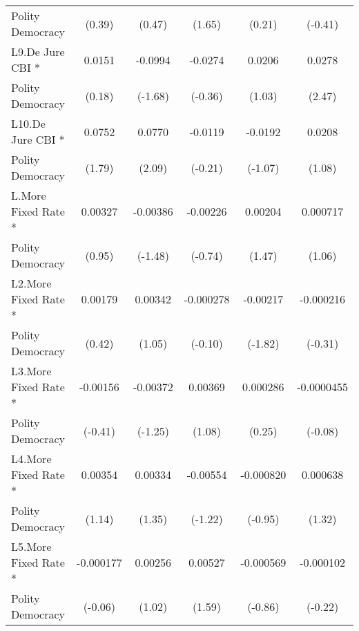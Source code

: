 {\begin{tabular}{l*{5}{c}}
Polity Democracy    &      (0.39)         &      (0.47)         &      (1.65)         &      (0.21)         &     (-0.41)         \\
[1em]
L9.De Jure CBI *    &      0.0151         &     -0.0994         &     -0.0274         &      0.0206         &      0.0278\sym{*}  \\
Polity Democracy    &      (0.18)         &     (-1.68)         &     (-0.36)         &      (1.03)         &      (2.47)         \\
[1em]
L10.De Jure CBI *   &      0.0752         &      0.0770\sym{*}  &     -0.0119         &     -0.0192         &      0.0208         \\
Polity Democracy    &      (1.79)         &      (2.09)         &     (-0.21)         &     (-1.07)         &      (1.08)         \\
[1em]
L.More Fixed Rate * &     0.00327         &    -0.00386         &    -0.00226         &     0.00204         &    0.000717         \\
Polity Democracy    &      (0.95)         &     (-1.48)         &     (-0.74)         &      (1.47)         &      (1.06)         \\
[1em]
L2.More Fixed Rate *&     0.00179         &     0.00342         &   -0.000278         &    -0.00217         &   -0.000216         \\
Polity Democracy    &      (0.42)         &      (1.05)         &     (-0.10)         &     (-1.82)         &     (-0.31)         \\
[1em]
L3.More Fixed Rate *&    -0.00156         &    -0.00372         &     0.00369         &    0.000286         &  -0.0000455         \\
Polity Democracy    &     (-0.41)         &     (-1.25)         &      (1.08)         &      (0.25)         &     (-0.08)         \\
[1em]
L4.More Fixed Rate *&     0.00354         &     0.00334         &    -0.00554         &   -0.000820         &    0.000638         \\
Polity Democracy    &      (1.14)         &      (1.35)         &     (-1.22)         &     (-0.95)         &      (1.32)         \\
[1em]
L5.More Fixed Rate *&   -0.000177         &     0.00256         &     0.00527         &   -0.000569         &   -0.000102         \\
Polity Democracy    &     (-0.06)         &      (1.02)         &      (1.59)         &     (-0.86)         &     (-0.22)         \\

\end{tabular}}

